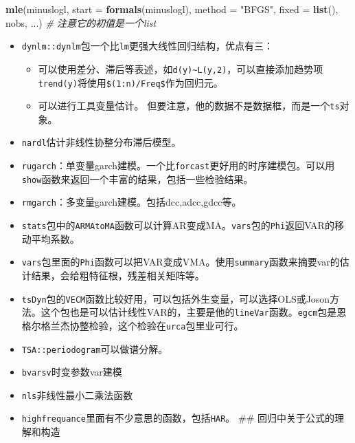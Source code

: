 \documentclass[
]{book}
\newenvironment{Shaded}{\begin{snugshade}}{\end{snugshade}}
\newcommand{\CommentTok}[1]{\textcolor[rgb]{0.56,0.35,0.01}{\textit{#1}}}
\newcommand{\DataTypeTok}[1]{\textcolor[rgb]{0.13,0.29,0.53}{#1}}
\newcommand{\KeywordTok}[1]{\textcolor[rgb]{0.13,0.29,0.53}{\textbf{#1}}}
\newcommand{\NormalTok}[1]{#1}
\newcommand{\StringTok}[1]{\textcolor[rgb]{0.31,0.60,0.02}{#1}}
\providecommand{\tightlist}{%
  \setlength{\itemsep}{0pt}\setlength{\parskip}{0pt}}
\begin{document}
\begin{Shaded}
\begin{Highlighting}[]
\KeywordTok{mle}\NormalTok{(minuslogl, }\DataTypeTok{start =} \KeywordTok{formals}\NormalTok{(minuslogl), }\DataTypeTok{method =} \StringTok{"BFGS"}\NormalTok{,}
    \DataTypeTok{fixed =} \KeywordTok{list}\NormalTok{(), nobs, ...) }\CommentTok{# 注意它的初值是一个list}
\end{Highlighting}
\end{Shaded}

\begin{itemize}
\tightlist
\item
  \texttt{dynlm::dynlm}包一个比\texttt{lm}更强大线性回归结构，优点有三：

  \begin{itemize}
  \tightlist
  \item
    可以使用差分、滞后等表述，如\texttt{d(y)\textasciitilde{}L(y,2)}，可以直接添加趋势项\texttt{trend(y)}将使用\texttt{\$(1:n)/Freq\$}作为回归元。
  \item
    可以进行工具变量估计。
    但要注意，他的数据不是数据框，而是一个\texttt{ts}对象。
  \end{itemize}
\item
  \texttt{nardl}估计非线性协整分布滞后模型。
\item
  \texttt{rugarch}：单变量garch建模。一个比\texttt{forcast}更好用的时序建模包。可以用\texttt{show}函数来返回一个丰富的结果，包括一些检验结果。
\item
  \texttt{rmgarch}：多变量garch建模。包括dcc,adcc,gdcc等。
\item
  \texttt{stats}包中的\texttt{ARMAtoMA}函数可以计算AR变成MA。\texttt{vars}包的\texttt{Phi}返回VAR的移动平均系数。
\item
  \texttt{vars}包里面的\texttt{Phi}函数可以把VAR变成VMA。使用\texttt{summary}函数来摘要var的估计结果，会给粗特征根，残差相关矩阵等。
\item
  \texttt{tsDyn}包的\texttt{VECM}函数比较好用，可以包括外生变量，可以选择OLS或Joson方法。这个包也是可以估计线性VAR的，主要是他的\texttt{lineVar}函数。\texttt{egcm}包是恩格尔格兰杰协整检验，这个检验在\texttt{urca}包里业可行。
\item
  \texttt{TSA::periodogram}可以做谱分解。
\item
  \texttt{bvarsv}时变参数var建模
\item
  \texttt{nls}非线性最小二乘法函数
\item
  \texttt{highfrequance}里面有不少意思的函数，包括\texttt{HAR}。
  \#\# 回归中关于公式的理解和构造
\end{itemize}
\end{document}
